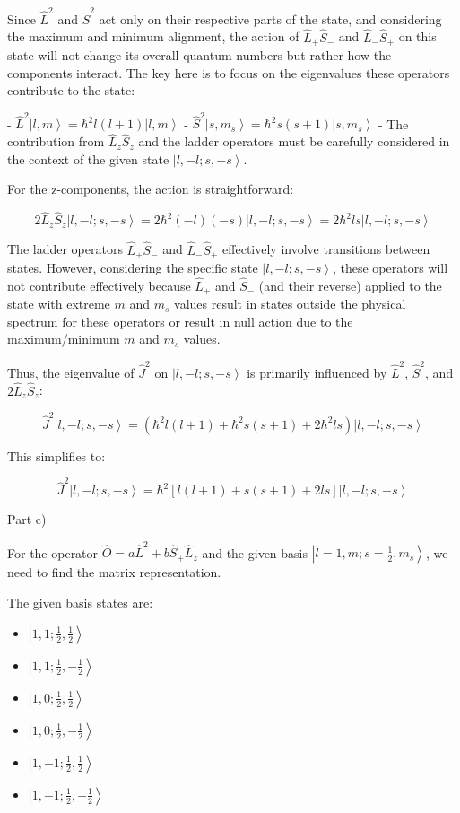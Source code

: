 Since \( \hat{L}^2 \) and \( \hat{S}^2 \) act only on their respective parts of the state, and considering the maximum and minimum alignment, the action of \( \hat{L}_{+}\hat{S}_{-} \) and \( \hat{L}_{-}\hat{S}_{+} \) on this state will not change its overall quantum numbers but rather how the components interact. The key here is to focus on the eigenvalues these operators contribute to the state:

- \( \hat{L}^2 \left|l, m \right> = \hbar^2 l(l+1) \left|l, m \right> \)
- \( \hat{S}^2 \left|s, m_s \right> = \hbar^2 s(s+1) \left|s, m_s \right> \)
- The contribution from \( \hat{L}_{z}\hat{S}_{z} \) and the ladder operators must be carefully considered in the context of the given state \( \left|l, -l; s, -s \right> \).

For the z-components, the action is straightforward:

\[
2\hat{L}_{z}\hat{S}_{z}\left|l, -l; s, -s \right> = 2\hbar^2 (-l)(-s)\left|l, -l; s, -s \right> = 2\hbar^2 ls\left|l, -l; s, -s \right>
\]

The ladder operators \( \hat{L}_{+}\hat{S}_{-} \) and \( \hat{L}_{-}\hat{S}_{+} \) effectively involve transitions between states. However, considering the specific state \( \left|l, -l; s, -s \right> \), these operators will not contribute effectively because \( \hat{L}_{+} \) and \( \hat{S}_{-} \) (and their reverse) applied to the state with extreme \( m \) and \( m_{s} \) values result in states outside the physical spectrum for these operators or result in null action due to the maximum/minimum \( m \) and \( m_{s} \) values.

Thus, the eigenvalue of \( \hat{J}^2 \) on \( \left|l, -l; s, -s \right> \) is primarily influenced by \( \hat{L}^2 \), \( \hat{S}^2 \), and \( 2\hat{L}_{z}\hat{S}_{z} \):

\[
\hat{J}^2\left|l, -l; s, -s \right> = (\hbar^2 l(l+1) + \hbar^2 s(s+1) + 2\hbar^2 ls)\left|l, -l; s, -s \right>
\]

This simplifies to:

\[
\hat{J}^2\left|l, -l; s, -s \right> = \hbar^2 [l(l+1) + s(s+1) + 2ls]\left|l, -l; s, -s \right>
\]

Part c)

For the operator \( \hat{O} = a\hat{L}^2 + b\hat{S}_{+}\hat{L}_{z} \) and the given basis \( \left|l=1, m; s=\frac{1}{2}, m_{s} \right> \), we need to find the matrix representation.

The given basis states are:

\begin{itemize}
    \item \( \left|1, 1; \frac{1}{2}, \frac{1}{2} \right> \)
    \item \( \left|1, 1; \frac{1}{2}, -\frac{1}{2} \right> \)
    \item \( \left|1, 0; \frac{1}{2}, \frac{1}{2} \right> \)
    \item \( \left|1, 0; \frac{1}{2}, -\frac{1}{2} \right> \)
    \item \( \left|1, -1; \frac{1}{2}, \frac{1}{2} \right> \)
    \item \( \left|1, -1; \frac{1}{2}, -\frac{1}{2} \right> \)
\end{itemize}

